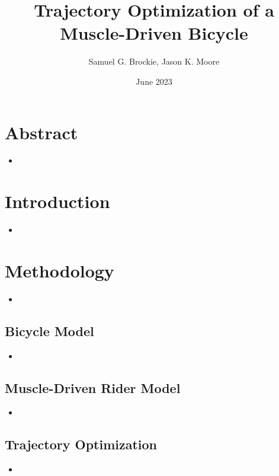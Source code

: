 \documentclass{article}
\title{Trajectory Optimization of a Muscle-Driven Bicycle}
\author{Samuel G. Brockie, Jason K. Moore}
\date{June 2023}
\begin{document}
\maketitle

\section{Abstract}

\begin{itemize}
    \item 
\end{itemize}

\section{Introduction}

\begin{itemize}
    \item 
\end{itemize}

\section{Methodology}

\begin{itemize}
    \item 
\end{itemize}

\subsection{Bicycle Model}

\begin{itemize}
    \item 
\end{itemize}

\subsection{Muscle-Driven Rider Model}

\begin{itemize}
    \item 
\end{itemize}

\subsection{Trajectory Optimization}

\begin{itemize}
    \item 
\end{itemize}
\end{document}
